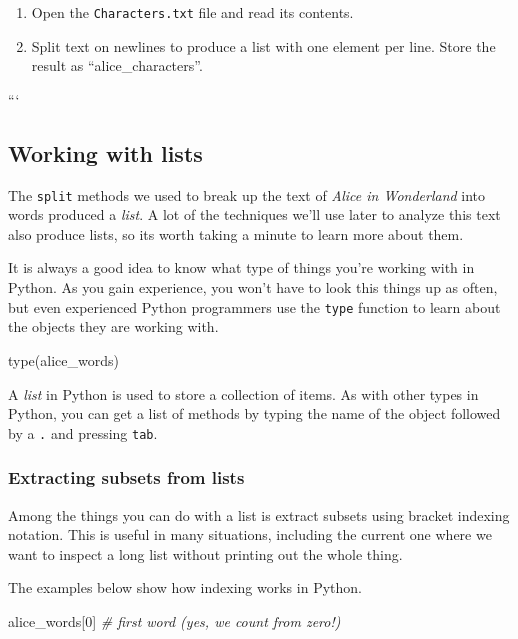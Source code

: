 \documentclass[]{book}
\newenvironment{Shaded}{\begin{snugshade}}{\end{snugshade}}
\newcommand{\DecValTok}[1]{\textcolor[rgb]{0.00,0.00,0.81}{#1}}
\newcommand{\CommentTok}[1]{\textcolor[rgb]{0.56,0.35,0.01}{\textit{#1}}}
\newcommand{\BuiltInTok}[1]{#1}
\newcommand{\NormalTok}[1]{#1}
\begin{document}
\begin{enumerate}
\def\labelenumi{\arabic{enumi}.}
\item
  Open the \texttt{Characters.txt} file and read its contents.
\item
  Split text on newlines to produce a list with one element per line.
  Store the result as ``alice\_characters''.
\end{enumerate}

```

\subsection{Working with lists}\label{working-with-lists}

The \texttt{split} methods we used to break up the text of \emph{Alice
in Wonderland} into words produced a \emph{list}. A lot of the
techniques we'll use later to analyze this text also produce lists, so
its worth taking a minute to learn more about them.

It is always a good idea to know what type of things you're working with
in Python. As you gain experience, you won't have to look this things up
as often, but even experienced Python programmers use the \texttt{type}
function to learn about the objects they are working with.

\begin{Shaded}
\begin{Highlighting}[]
\BuiltInTok{type}\NormalTok{(alice_words)}
\end{Highlighting}
\end{Shaded}

A \emph{list} in Python is used to store a collection of items. As with
other types in Python, you can get a list of methods by typing the name
of the object followed by a \texttt{.} and pressing \texttt{tab}.

\subsubsection{Extracting subsets from
lists}\label{extracting-subsets-from-lists}

Among the things you can do with a list is extract subsets using bracket
indexing notation. This is useful in many situations, including the
current one where we want to inspect a long list without printing out
the whole thing.

The examples below show how indexing works in Python.

\begin{Shaded}
\begin{Highlighting}[]
\NormalTok{alice_words[}\DecValTok{0}\NormalTok{] }\CommentTok{# first word (yes, we count from zero!)}
\end{Highlighting}
\end{Shaded}
\end{document}
